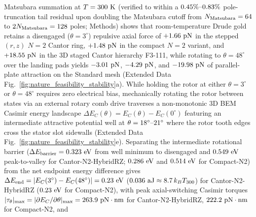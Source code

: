 \documentclass[pdflatex,sn-nature]{sn-jnl}
\DeclareRobustCommand{\roundone}[1]{\fpeval{round(#1,1)}}
\DeclareRobustCommand{\roundtwo}[1]{\fpeval{round(#1,2)}}
\DeclareRobustCommand{\roundthree}[1]{\fpeval{round(#1,3)}}
\begin{document}
Matsubara summation at $T = 300{}\text{ K}$ (verified to within a $\roundtwo{\BemValMatsubaraCantorThetathreeTailRelPct}\%\text{--}\roundtwo{\BemValMatsubaraCantorThetafoureightTailRelPct}\%$ pole-truncation tail residual upon doubling the Matsubara cutoff from $N_{\rm Matsubara} = 64{}$ to $2N_{\rm Matsubara} = 128{}$ poles; Methods) shows that room-temperature Drude gold retains a disengaged ($\theta=3^\circ$) repulsive axial force of $+\roundtwo{\NatureCantorNtwoHybridrzPatchPotentialFCasimirGoldThreezerozerokPn}\text{ pN}$ in the stepped $(r,z)$ $N=2$ Cantor ring, $+\roundtwo{\NatureRotCeightCompactNtwoPatchPotentialFCasimirGoldThreezerozerokPn}\text{ pN}$ in the compact $N=2$ variant, and $+\roundtwo{\NatureFthreeOneoneoneFRepThreezerozerokPn}\text{ pN}$ in the 3D staged Cantor hierarchy F3-111, while rotating to $\theta=48^\circ$ over the landing pads yields $\roundtwo{\NatureCantorNtwoHybridrzStepfiveForceZPn}\text{ pN}$, $\roundtwo{\NatureRotCeightCompactNtwoSteptwooneForceZPn}\text{ pN}$, and $\roundtwo{\NatureFthreeOneoneoneFEngagedThreezerozerokPn}\text{ pN}$ of parallel-plate attraction on the Standard mesh (Extended Data Fig.~\ref{fig:nature_feasibility_stability}a). While holding the rotor at either $\theta = 3^\circ$ or $\theta = 48^\circ$ requires zero electrical bias, mechanically rotating the rotor between states via an external rotary comb drive traverses a non-monotonic 3D BEM Casimir energy landscape $\Delta E_C(\theta) = E_C(\theta) - E_C(0^\circ)$ featuring an intermediate attractive potential well at $\theta = 18{}^\circ\text{--}21^\circ$ where the rotor tooth edges cross the stator slot sidewalls (Extended Data Fig.~\ref{fig:nature_feasibility_stability}e). Separating the intermediate rotational barrier ($\Delta E_{\rm barrier} = \roundthree{\NatureCantorNtwoHybridrzRotationalEnergyBarrierSwitchingBarrierFromMinToDisengagedEv}\text{ eV}$ from well minimum to disengaged and $\roundthree{\NatureCantorNtwoHybridrzRotationalEnergyBarrierSwitchingBarrierPeakToValleyEv}\text{ eV}$ peak-to-valley for Cantor-N2-HybridRZ; $\roundthree{\NatureRotCeightCompactNtwoRotationalEnergyBarrierSwitchingBarrierFromMinToDisengagedEv}\text{ eV}$ and $\roundthree{\NatureRotCeightCompactNtwoRotationalEnergyBarrierSwitchingBarrierPeakToValleyEv}\text{ eV}$ for Compact-N2) from the net endpoint energy difference gives $\Delta E_{\rm end} = |E_C(3^\circ) - E_C(48^\circ)| = \roundtwo{\NatureCantorNtwoHybridrzRotationalEnergyBarrierSwitchingWorkEv}\text{ eV}$ ($\roundthree{\NatureCantorNtwoHybridrzRotationalEnergyBarrierSwitchingWorkAj}\text{ aJ} \approx \roundone{\NatureCantorNtwoHybridrzRotationalEnergyBarrierSwitchingWorkOverKbtthreezerozero}\,k_B T_{300}$) for Cantor-N2-HybridRZ ($\roundtwo{\NatureRotCeightCompactNtwoRotationalEnergyBarrierSwitchingWorkEv}\text{ eV}$ for Compact-N2), with peak axial-switching Casimir torques $|\tau_\theta|_{\max} = |\partial E_C/\partial\theta|_{\max} = \roundone{\NatureCantorNtwoHybridrzPeakTorquePnNm}\text{ pN}\cdot\text{nm}$ for Cantor-N2-HybridRZ, $\roundone{\NatureRotCeightCompactNtwoPeakTorquePnNm}\text{ pN}\cdot\text{nm}$ for Compact-N2, and 
\end{document}
